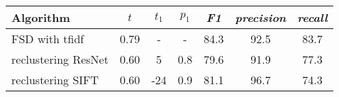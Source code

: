 \begin{tabular}{|l|cccccc|}
\hline
  \textbf{Algorithm} &   $t$ & $t_1$ & $p_1$ &  \textit{F1} &  \textit{precision} &  \textit{recall} \\
\hline
      FSD with tfidf &  0.79 &     - &     - &         84.3 &                92.5 &             83.7 \\
 reclustering ResNet &  0.60 &     5 &   0.8 &         79.6 &                91.9 &             77.3 \\
   reclustering SIFT &  0.60 &   -24 &   0.9 &         81.1 &                96.7 &             74.3 \\
\hline
\end{tabular}

